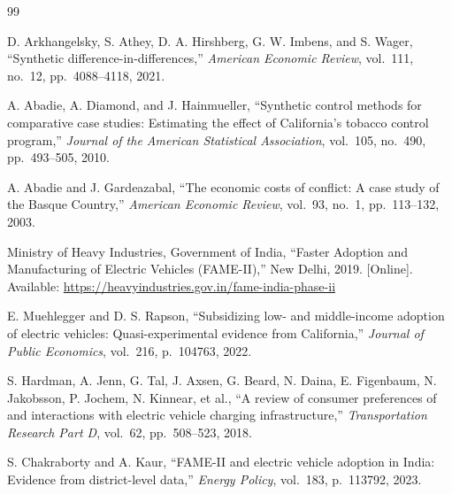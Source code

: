 \documentclass[journal]{IEEEtran}
\begin{document}

\begin{thebibliography}{99}

D. Arkhangelsky, S. Athey, D. A. Hirshberg, G. W. Imbens, and S. Wager,
``Synthetic difference-in-differences,''
\emph{American Economic Review}, vol.~111, no.~12, pp.~4088--4118, 2021.

A. Abadie, A. Diamond, and J. Hainmueller,
``Synthetic control methods for comparative case studies: Estimating the 
effect of California's tobacco control program,''
\emph{Journal of the American Statistical Association}, vol.~105, no.~490, 
pp.~493--505, 2010.

A. Abadie and J. Gardeazabal,
``The economic costs of conflict: A case study of the Basque Country,''
\emph{American Economic Review}, vol.~93, no.~1, pp.~113--132, 2003.

Ministry of Heavy Industries, Government of India,
``Faster Adoption and Manufacturing of Electric Vehicles (FAME-II),''
New Delhi, 2019. [Online]. Available: 
\url{https://heavyindustries.gov.in/fame-india-phase-ii}

E. Muehlegger and D. S. Rapson,
``Subsidizing low- and middle-income adoption of electric vehicles: 
Quasi-experimental evidence from California,''
\emph{Journal of Public Economics}, vol.~216, p.~104763, 2022.

S. Hardman, A. Jenn, G. Tal, J. Axsen, G. Beard, N. Daina, 
E. Figenbaum, N. Jakobsson, P. Jochem, N. Kinnear, et al.,
``A review of consumer preferences of and interactions with electric 
vehicle charging infrastructure,''
\emph{Transportation Research Part D}, vol.~62, pp.~508--523, 2018.

S. Chakraborty and A. Kaur,
``FAME-II and electric vehicle adoption in India: Evidence from 
district-level data,''
\emph{Energy Policy}, vol.~183, p.~113792, 2023.

\end{thebibliography}
\end{document}
